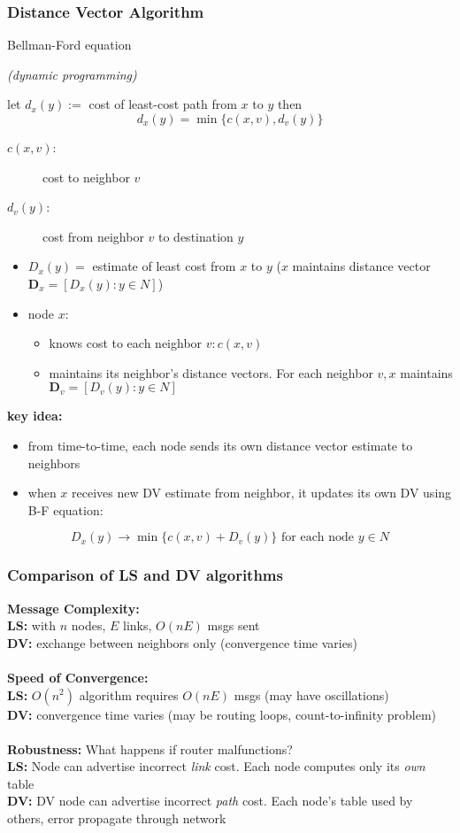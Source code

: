 \subsubsection{Distance Vector Algorithm}
\begin{note}{Bellman-Ford equation}
	\begin{flushright}\textit{(dynamic programming)}\end{flushright}
	let $d_x(y):=$ cost of least-cost path from $x$ to $y$ then
	\[
		d_x(y)=\min\{ c(x,v),d_v(y) \}
	\]
	\begin{description}
		\item[$c(x,v)$:] cost to neighbor $v$
		\item[$d_v(y)$:] cost from neighbor $v$ to destination $y$
	\end{description}
\end{note}
\begin{itemize}
	\item $D_x(y)=$ estimate of least cost from $x$ to $y$ ($x$ maintains distance vector $\mathbf{D}_x=[D_x(y):y\in N]$)
	\item node $x$:
	\begin{itemize}
		\item knows cost to each neighbor $v:c(x,v)$
		\item maintains its neighbor's distance vectors. For each neighbor $v,x$ maintains $\mathbf{D}_v=[D_v(y):y\in N]$
	\end{itemize}
\end{itemize}
\textbf{key idea:}
\begin{itemize}
	\item from time-to-time, each node sends its own distance vector estimate to neighbors
	\item when $x$ receives new DV estimate from neighbor, it updates its own DV using B-F equation:
\end{itemize}
\[
	D_x(y)\rightarrow\min\{ c(x,v)+D_v(y) \} \text{ for each node } y\in N
\]
\subsubsection{Comparison of LS and DV algorithms}
\textbf{Message Complexity:}\\
\textbf{LS:} with $n$ nodes, $E$ links, $O(nE)$ msgs sent\\
\textbf{DV:} exchange between neighbors only (convergence time varies)\\\\
\textbf{Speed of Convergence:}\\
\textbf{LS:} $O(n^2)$ algorithm requires $O(nE)$ msgs (may have oscillations)\\
\textbf{DV:} convergence time varies (may be routing loops, count-to-infinity problem)\\\\
\textbf{Robustness:} What happens if router malfunctions?\\
\textbf{LS:} Node can advertise incorrect \textit{link} cost. Each node computes only its \textit{own} table\\
\textbf{DV:} DV node can advertise incorrect \textit{path} cost. Each node's table used by others, error propagate through network

